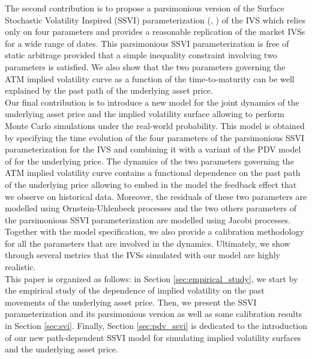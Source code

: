 The second contribution is to propose a parsimonious version of the Surface Stochastic Volatility Inspired (SSVI) parameterization (\citeauthor{gatheral2014arbitrage}, \citeyear{gatheral2014arbitrage}) of the IVS which relies only on four parameters and provides a reasonable replication of the market IVSs for a wide range of dates. This parsimonious SSVI parameterization is free of static arbitrage provided that a simple inequality constraint involving two parameters is satisfied. We also show that the two parameters governing the ATM implied volatility curve as a function of the time-to-maturity can be well explained by the past path of the underlying asset price. \\

Our final contribution is to introduce a new model for the joint dynamics of the underlying asset price and the implied volatility surface allowing to perform Monte Carlo simulations under the real-world probability. This model is obtained by specifying the time evolution of the four parameters of the parsimonious SSVI parameterization for the IVS and combining it with a variant of the PDV model of \cite{guyon2022volatility} for the underlying price. The dynamics of the two parameters governing the ATM implied volatility curve contains a functional dependence on the past path of the underlying price allowing to embed in the model the feedback effect that we observe on historical data. Moreover, the residuals of these two parameters are modelled using Ornstein-Uhlenbeck processes and the two others parameters of the parsimonious SSVI parameterization are modelled using Jacobi processes. Together with the model specification, we also provide a calibration methodology for all the parameters that are involved in the dynamics. Ultimately, we show through several metrics that the IVSs simulated with our model are highly realistic. \\

This paper is organized as follows: in Section \ref{sec:empirical_study}, we start by the empirical study of the dependence of implied volatility on the past movements of the underlying asset price. Then, we present the SSVI parameterization and its parsimonious version as well as some calibration results in Section \ref{sec:svi}. Finally, Section \ref{sec:pdv_ssvi} is dedicated to the introduction of our new path-dependent SSVI model for simulating implied volatility surfaces and the underlying asset price. 


